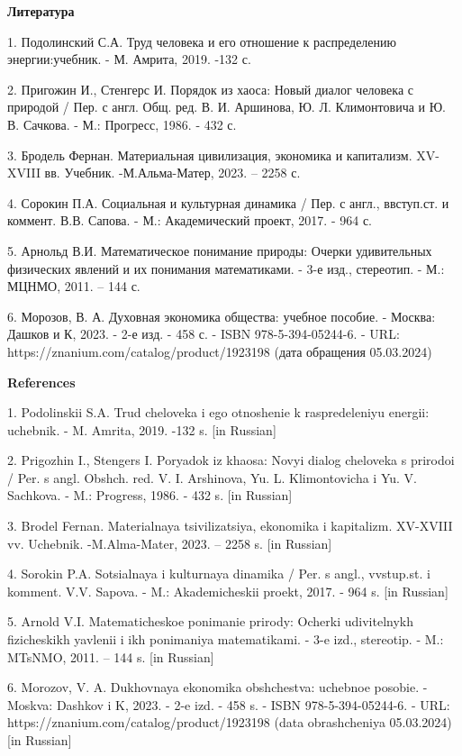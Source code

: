 \begin{center}
{\bfseries Литература}
\end{center}

\begin{noparindent}
1. Подолинский С.А. Труд человека и его отношение к распределению
энергии:учебник. - М. Амрита, 2019. -132 с.

2. Пригожин И., Стенгерс И. Порядок из хаоса: Новый диалог человека с
природой / Пер. с англ. Общ. ред. В. И. Аршинова, Ю. Л. Климонтовича и
Ю. В. Сачкова. - М.: Прогресс, 1986. - 432 с.

3. Бродель Фернан. Материальная цивилизация, экономика и капитализм.
XV-XVIII вв. Учебник. -М.Альма-Матер, 2023. -- 2258 с.

4. Сорокин П.А. Социальная и культурная динамика / Пер. с англ.,
ввступ.ст. и коммент. В.В. Сапова. - М.: Академический проект, 2017. -
964 с.

5. Арнольд В.И. Математическое понимание природы: Очерки удивительных
физических явлений и их понимания математиками. - 3-е изд., стереотип. -
М.: МЦНМО, 2011. -- 144 с.

6. Морозов, В. А. Духовная экономика общества: учебное пособие. -
Москва: Дашков и К, 2023. - 2-е изд. - 458 с. - ISBN 978-5-394-05244-6.
- URL: https://znanium.com/catalog/product/1923198 (дата обращения
05.03.2024)
\end{noparindent}

\begin{center}
{\bfseries References}
\end{center}

\begin{noparindent}
1. Podolinskii S.A. Trud cheloveka i ego otnoshenie k raspredeleniyu
energii: uchebnik. - M. Amrita, 2019. -132 s. {[}in Russian{]}

2. Prigozhin I., Stengers I. Poryadok iz khaosa: Novyi dialog cheloveka
s prirodoi / Per. s angl. Obshch. red. V. I. Arshinova, Yu. L.
Klimontovicha i Yu. V. Sachkova. - M.: Progress, 1986. - 432 s. {[}in
Russian{]}

3. Brodel\textquotesingle{} Fernan. Material\textquotesingle naya
tsivilizatsiya, ekonomika i kapitalizm. XV-XVIII vv. Uchebnik.
-M.Al\textquotesingle ma-Mater, 2023. -- 2258 s. {[}in Russian{]}

4. Sorokin P.A. Sotsial\textquotesingle naya i
kul\textquotesingle turnaya dinamika / Per. s angl., vvstup.st. i
komment. V.V. Sapova. - M.: Akademicheskii proekt, 2017. - 964 s. {[}in
Russian{]}

5. Arnol\textquotesingle d V.I. Matematicheskoe ponimanie prirody:
Ocherki udivitel\textquotesingle nykh fizicheskikh yavlenii i ikh
ponimaniya matematikami. - 3-e izd., stereotip. - M.: MTsNMO, 2011. --
144 s. {[}in Russian{]}

6. Morozov, V. A. Dukhovnaya ekonomika obshchestva: uchebnoe posobie. -
Moskva: Dashkov i K, 2023. - 2-e izd. - 458 s. - ISBN 978-5-394-05244-6.
- URL: https://znanium.com/catalog/product/1923198 (data obrashcheniya
05.03.2024) {[}in Russian{]}
\end{noparindent}

